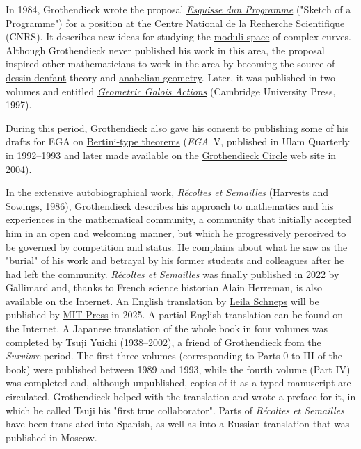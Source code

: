 In 1984, Grothendieck wrote the proposal \emph{\href{https://en.wikipedia.org/wiki/Esquisse_d'un_Programme}{Esquisse d\textquotesingle un Programme}} ("Sketch of a Programme") for a position at the \href{https://en.wikipedia.org/wiki/Centre_National_de_la_Recherche_Scientifique}{Centre National de la Recherche Scientifique} (CNRS). It describes new ideas for studying the \href{https://en.wikipedia.org/wiki/Moduli_space}{moduli space} of complex curves. Although Grothendieck never published his work in this area, the proposal inspired other mathematicians to work in the area by becoming the source of \href{https://en.wikipedia.org/wiki/Dessin_d'enfant}{dessin d\textquotesingle enfant} theory and \href{https://en.wikipedia.org/wiki/Anabelian_geometry}{anabelian geometry}. Later, it was published in two-volumes and entitled \href{https://books.google.com/books?id=Hlf1j2XmXkcC&q=Geometric+Galois+Actions}{\emph{Geometric Galois Actions}} (Cambridge University Press, 1997).

During this period, Grothendieck also gave his consent to publishing some of his drafts for EGA on \href{https://en.wikipedia.org/wiki/Theorem_of_Bertini}{Bertini-type theorems} (\emph{EGA}{~}V, published in Ulam Quarterly in 1992--1993 and later made available on the \href{http://www.grothendieckcircle.org/}{Grothendieck Circle} web site in 2004).

In the extensive autobiographical work, \emph{Récoltes et Semailles} (\textquotesingle Harvests and Sowings\textquotesingle, 1986), Grothendieck describes his approach to mathematics and his experiences in the mathematical community, a community that initially accepted him in an open and welcoming manner, but which he progressively perceived to be governed by competition and status. He complains about what he saw as the "burial" of his work and betrayal by his former students and colleagues after he had left the community. \emph{Récoltes et Semailles} was finally published in 2022 by Gallimard and, thanks to French science historian Alain Herreman, is also available on the Internet. An English translation by \href{https://en.wikipedia.org/wiki/Leila_Schneps}{Leila Schneps} will be published by \href{https://en.wikipedia.org/wiki/MIT_Press}{MIT Press} in 2025. A partial English translation can be found on the Internet. A Japanese translation of the whole book in four volumes was completed by Tsuji Yuichi (1938--2002), a friend of Grothendieck from the \emph{Survivre} period. The first three volumes (corresponding to Parts 0 to III of the book) were published between 1989 and 1993, while the fourth volume (Part IV) was completed and, although unpublished, copies of it as a typed manuscript are circulated. Grothendieck helped with the translation and wrote a preface for it, in which he called Tsuji his "first true collaborator". Parts of \emph{Récoltes et Semailles} have been translated into Spanish, as well as into a Russian translation that was published in Moscow.


